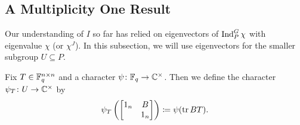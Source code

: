 \subsection{A Multiplicity One Result}
Our understanding of $I$ so far has relied on eigenvectors of $\operatorname{Ind}_P^G\chi$ with eigenvalue $\chi$ (or $\chi^J$). In this subsection, we will use eigenvectors
for the smaller subgroup $U\subseteq P$.
\begin{definition}
	Fix $T\in \mathbb F_q^{n\times n}$ and a character $\psi\colon\mathbb F_q\to\mathbb C^\times$. Then we define the character $\psi_T\colon U\to\mathbb C^\times$ by
	\[\psi_T\left(\begin{bmatrix}
		1_n & B \\ & 1_n
	\end{bmatrix}\right)\coloneqq\psi(\operatorname{tr} BT).\]
\end{definition}
